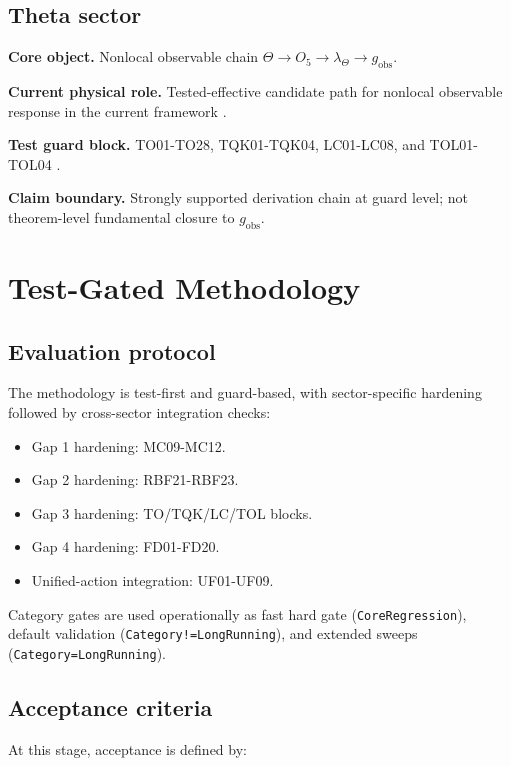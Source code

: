 \documentclass[11pt,a4paper]{article}
\begin{document}
\subsection{Theta sector}

\textbf{Core object.} Nonlocal observable chain \(\Theta \rightarrow O_5 \rightarrow \lambda_\Theta \rightarrow g_{\mathrm{obs}}\).

\textbf{Current physical role.} Tested-effective candidate path for nonlocal observable response in the current framework \cite{field_sector_map}.

\textbf{Test guard block.} TO01-TO28, TQK01-TQK04, LC01-LC08, and TOL01-TOL04 \cite{trm_status_v3,real_physics_coverage}.

\textbf{Claim boundary.} Strongly supported derivation chain at guard level; not theorem-level fundamental closure to \(g_{\mathrm{obs}}\).

\section{Test-Gated Methodology}

\subsection{Evaluation protocol}

The methodology is test-first and guard-based, with sector-specific hardening followed by cross-sector integration checks:

\begin{itemize}
  \item Gap 1 hardening: MC09-MC12.
  \item Gap 2 hardening: RBF21-RBF23.
  \item Gap 3 hardening: TO/TQK/LC/TOL blocks.
  \item Gap 4 hardening: FD01-FD20.
  \item Unified-action integration: UF01-UF09.
\end{itemize}

Category gates are used operationally as fast hard gate (\texttt{CoreRegression}), default validation (\texttt{Category!=LongRunning}), and extended sweeps (\texttt{Category=LongRunning}).

\subsection{Acceptance criteria}

At this stage, acceptance is defined by:
\end{document}
